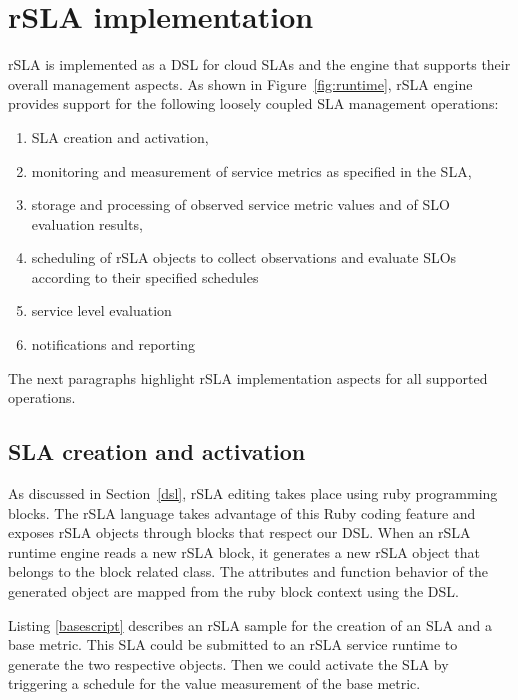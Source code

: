 \section{rSLA implementation}\label{runtime} 

rSLA is implemented as a DSL for cloud SLAs and the engine that supports their overall management aspects. As shown in Figure~\ref{fig:runtime}, rSLA engine provides support for 
the following loosely coupled SLA management operations:
\begin{enumerate}
\item SLA creation and activation,
\item monitoring and measurement of service metrics as specified in the SLA,
\item storage and processing of observed service metric values and of SLO evaluation results,
\item scheduling of rSLA objects to collect observations and evaluate SLOs according to their 
specified schedules
\item service level evaluation 
\item notifications and reporting
\end{enumerate}

The next paragraphs highlight rSLA implementation aspects for all supported operations.

\subsection{SLA creation and activation}

As discussed in Section~\ref{dsl}, rSLA editing takes place using ruby programming blocks. The rSLA language takes advantage of this Ruby coding feature and exposes rSLA objects 
through blocks that respect our DSL. When an rSLA runtime engine reads a new rSLA block, it generates a new rSLA object that belongs to the block related class. The 
attributes and function behavior of the generated object are mapped from the ruby block context using the DSL. 

Listing \ref{basescript} describes an rSLA sample for the creation of an SLA and a base metric. This SLA could be submitted to an rSLA service runtime to generate the 
two respective objects. Then we could activate the SLA by triggering a schedule for the value measurement of the base metric.


